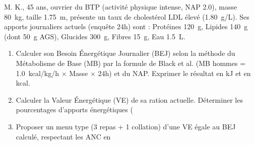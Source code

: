 \documentclass[11pt]{article}
\begin{document}
\begin{exercice}
M. K., 45 ans, ouvrier du BTP (activité physique intense, NAP \SI{2.0}{}), masse \SI{80}{kg}, taille \SI{1.75}{m}, présente un taux de cholestérol LDL élevé (\SI{1.80}{g/L}). Ses apports journaliers actuels (enquête 24h) sont : Protéines \SI{120}{g}, Lipides \SI{140}{g} (dont \SI{50}{g} AGS), Glucides \SI{300}{g}, Fibres \SI{15}{g}, Eau \SI{1.5}{L}.
\begin{enumerate}
    \item Calculer son Besoin Énergétique Journalier (BEJ) selon la méthode du Métabolisme de Base (MB) par la formule de Black et al. (MB hommes = \SI{1.0}{kcal/kg/h} $\times$ Masse $\times$ 24h) et du NAP. Exprimer le résultat en kJ et en kcal.
    \item Calculer la Valeur Énergétique (VE) de sa ration actuelle. Déterminer les pourcentages d'apports énergétiques (%
    \item Proposer un menu type (3 repas + 1 collation) d'une VE égale au BEJ calculé, respectant les ANC en %
\end{enumerate}
\end{exercice}
\end{document}
